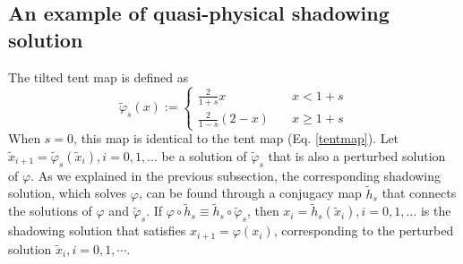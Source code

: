 \subsection{An example of quasi-physical shadowing solution}
\label{sec:sub:quasi-physical-shadow}
The tilted tent map is defined as
\begin{equation} \label{tent_tilted}
    \tilde\varphi_s(x) := \begin{cases}
    \frac2{1+s} x \quad & x < 1+s \\
    \frac2{1-s}(2-x) \quad & x \ge 1+s
    \end{cases}
\end{equation}
When $s=0$, this map is identical to the tent map (Eq. \ref{tentmap}).
Let $\tilde{x}_{i+1}=\tilde\varphi_s(\tilde{x}_i), i=0,1,\ldots$ be a solution of 
$\tilde{\varphi}_s$ that is also a perturbed solution of $\varphi$.
As we explained in the previous subsection,
the corresponding 
shadowing solution, which solves $\varphi$, can be found through a conjugacy map $\tilde{h}_s$ that connects the solutions of $\varphi$ and $\tilde{\varphi}_s$.
If $\varphi\circ \tilde{h}_s \equiv \tilde{h}_s\circ\tilde\varphi_s$,
then $x_i=\tilde{h}_s(\tilde{x}_i), i=0,1,\ldots$ is the shadowing solution 
that satisfies $x_{i+1} = \varphi(x_i)$, corresponding to the perturbed solution 
$\tilde{x}_i,i=0,1,\cdots$.

